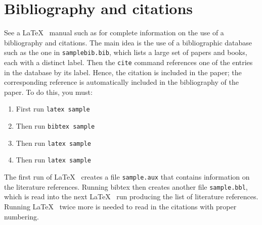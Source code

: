 \section{Bibliography and citations}
See a \LaTeX~ manual such as \cite{go-mi-sa:latex}
for complete information on the use of a bibliography and citations.  The 
main idea is the use of a bibliographic
database such as the one in {\tt samplebib.bib}, which lists a large set of papers and
books, each with a distinct label.  Then the  {\tt cite} command references one of the entries in
the database by its label.  Hence, the citation is included in the paper; the corresponding reference 
is automatically included in the bibliography of the paper.  To do this, you must:
\begin{enumerate}
\item First run {\tt latex sample}
\item Then run {\tt bibtex sample}
\item Then run {\tt latex sample}
\item Then run {\tt latex sample}
\end{enumerate}
The first run of \LaTeX~ creates a file {\tt sample.aux}
that contains information on the literature references.
Running bibtex then creates another file {\tt sample.bbl}, which is read into
the next \LaTeX~ run producing the list of literature references.  
Running \LaTeX~ twice more is needed to read in the citations with proper numbering. 

